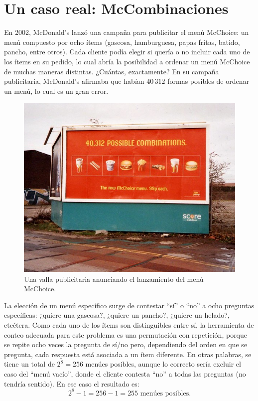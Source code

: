 \documentclass[
  letterpaper,
  DIV=11,
  numbers=noendperiod]{scrreprt}
\begin{document}
\hypertarget{un-caso-real-mccombinaciones}{%
\section{Un caso real:
McCombinaciones}\label{un-caso-real-mccombinaciones}}

En 2002, McDonald's lanzó una campaña para publicitar el menú McChoice:
un menú compuesto por ocho ítems (gaseosa, hamburguesa, papas fritas,
batido, pancho, entre otros). Cada cliente podía elegir si quería o no
incluir cada uno de los ítems en su pedido, lo cual abría la posibilidad
a ordenar un menú McChoice de muchas maneras distintas. ¿Cuántas,
exactamente? En su campaña publicitaria, McDonald's afirmaba que habían
\(40\,312\) formas posibles de ordenar un menú, lo cual es un gran
error.

\begin{figure}

{\centering \includegraphics{img/mccombos.png}

}

\caption{\label{fig-mccombos}Una valla publicitaria anunciando el
lanzamiento del menú McChoice.}

\end{figure}

La elección de un menú específico surge de contestar ``sí'' o ``no'' a
ocho preguntas específicas: ¿quiere una gaseosa?, ¿quiere un pancho?,
¿quiere un helado?, etcétera. Como cada uno de los ítems son
distinguibles entre sí, la herramienta de conteo adecuada para este
problema es una permutación con repetición, porque se repite ocho veces
la pregunta de sí/no pero, dependiendo del orden en que se pregunta,
cada respuesta está asociada a un ítem diferente. En otras palabras, se
tiene un total de \(2^8 = 256\) menúes posibles, aunque lo correcto
sería excluir el caso del ``menú vacío'', donde el cliente contesta
``no'' a todas las preguntas (no tendría sentido). En ese caso el
resultado es: \[2^8 - 1 = 256 - 1 = 255 \text{ menúes posibles.}\]
\end{document}
